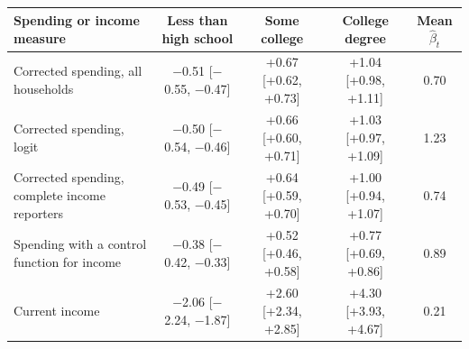 \footnotesize
\begin{tabular}{lcccc}
\toprule
Spending or income measure & Less than high school & Some college & College degree & Mean $\hat\beta_t$ \\
\midrule
Corrected spending, all households & $-$0.51 [$-$0.55, $-$0.47] & +0.67 [+0.62, +0.73] & +1.04 [+0.98, +1.11] & 0.70 \\
Corrected spending, logit & $-$0.50 [$-$0.54, $-$0.46] & +0.66 [+0.60, +0.71] & +1.03 [+0.97, +1.09] & 1.23 \\
Corrected spending, complete income reporters & $-$0.49 [$-$0.53, $-$0.45] & +0.64 [+0.59, +0.70] & +1.00 [+0.94, +1.07] & 0.74 \\
Spending with a control function for income & $-$0.38 [$-$0.42, $-$0.33] & +0.52 [+0.46, +0.58] & +0.77 [+0.69, +0.86] & 0.89 \\
Current income & $-$2.06 [$-$2.24, $-$1.87] & +2.60 [+2.34, +2.85] & +4.30 [+3.93, +4.67] & 0.21 \\
\bottomrule
\end{tabular}
